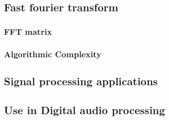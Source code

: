 \subsection{Fast fourier transform}
\subsubsection{FFT matrix}
\subsubsection{Algorithmic Complexity}

\subsection{Signal processing applications}

\subsection{Use in Digital audio processing}

